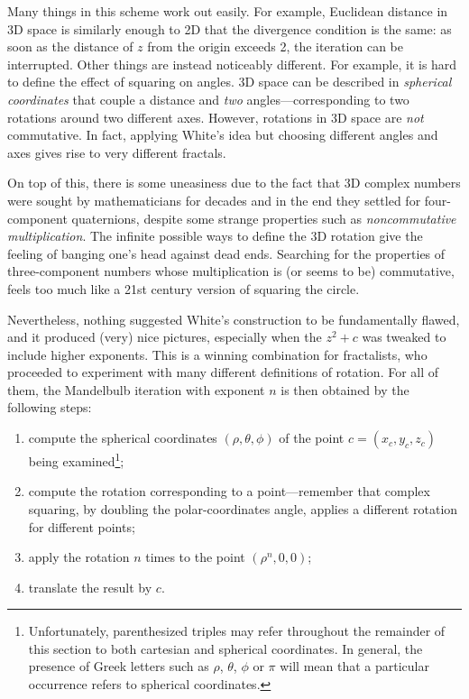 \documentclass{article}
\begin{document}
Many things in this scheme work out easily.  For example, Euclidean
distance in 3D space is similarly enough to 2D that the divergence
condition is the same: as soon as the distance of $z$ from the origin
exceeds 2, the iteration can be interrupted.  Other things are instead
noticeably different.  For example, it is hard to define the effect of
squaring on angles.  3D space can be described in \emph{spherical
  coordinates} that couple a distance and \emph{two}
angles---corresponding to two rotations around two different axes.
However, rotations in 3D space are \emph{not} commutative.  In fact,
applying White's idea but choosing different angles and axes gives
rise to very different fractals.

On top of this, there is some uneasiness due to the fact that 3D
complex numbers were sought by mathematicians for decades and in the
end they settled for four-component quaternions, despite some strange
properties such as \emph{noncommutative multiplication}.  The infinite
possible ways to define the 3D rotation give the feeling of banging
one's head against dead ends.  Searching for the properties of
three-component numbers whose multiplication is (or seems to be)
commutative, feels too much like a 21st century version of squaring
the circle.

Nevertheless, nothing suggested White's construction to be
fundamentally flawed, and it produced (very) nice pictures, especially
when the $z^2+c$ was tweaked to include higher exponents.  This is a
winning combination for fractalists, who proceeded to experiment
with many different definitions of rotation.  For all of them, the
Mandelbulb iteration with exponent $n$ is then obtained by the
following steps:
\begin{enumerate}
\item \label{item:first-step}
  compute the spherical coordinates $(\rho,\theta,\phi)$ of the
  point $c=(x_c,y_c,z_c)$ being examined\footnote{Unfortunately,
    parenthesized triples may refer throughout the remainder of this
    section to both cartesian and spherical coordinates.  In general,
    the presence of Greek letters such as $\rho$, $\theta$, $\phi$ or
    $\pi$ will mean that a particular occurrence refers to spherical
    coordinates.};

\item \label{item:choice} compute the rotation corresponding to a
  point---remember that complex squaring, by doubling the
  polar-coordinates angle, applies a different rotation for different
  points;

\item \label{item:last-step}
  apply the rotation $n$ times to the point $(\rho^n,0,0)$;
\item translate the result by $c$.
\end{enumerate}
\end{document}
